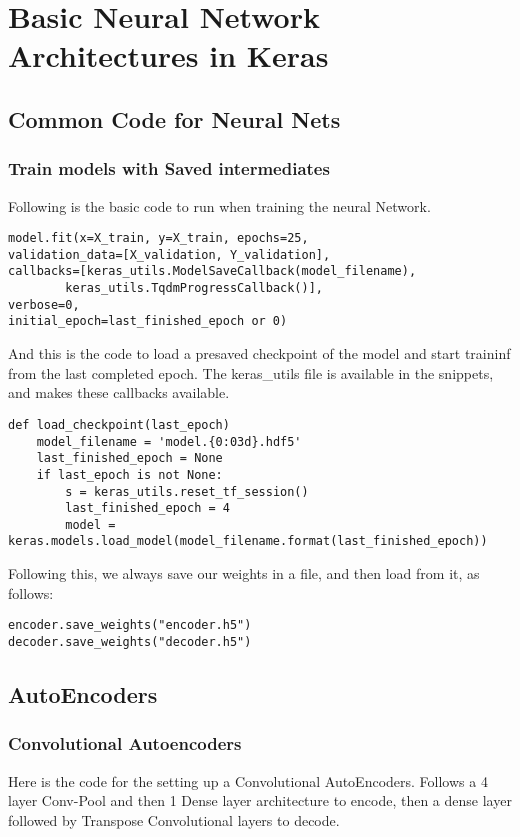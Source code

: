 \chapter{Basic Neural Network Architectures in Keras}

\section{Common Code for Neural Nets}


\subsection{Train models with Saved intermediates}


Following is the basic code to run when training the neural Network.

\begin{lstlisting}[style=py]
model.fit(x=X_train, y=X_train, epochs=25,
validation_data=[X_validation, Y_validation],
callbacks=[keras_utils.ModelSaveCallback(model_filename),
        keras_utils.TqdmProgressCallback()],
verbose=0,
initial_epoch=last_finished_epoch or 0)
\end{lstlisting}

And this is the code to load a presaved checkpoint of the model and start traininf from the last completed epoch. The keras\_utils file is available in the snippets, and makes these callbacks available.

\begin{lstlisting}[style=py]
def load_checkpoint(last_epoch)
    model_filename = 'model.{0:03d}.hdf5'
    last_finished_epoch = None
    if last_epoch is not None:
        s = keras_utils.reset_tf_session()
        last_finished_epoch = 4
        model = keras.models.load_model(model_filename.format(last_finished_epoch))
\end{lstlisting}

Following this, we always save our weights in a file, and then load from it, as follows:
\begin{lstlisting}[style=py]
encoder.save_weights("encoder.h5")
decoder.save_weights("decoder.h5")
\end{lstlisting}



\section{AutoEncoders}

\subsection{Convolutional Autoencoders}

Here is the code for the setting up a Convolutional AutoEncoders. Follows a 4 layer Conv-Pool and then 1 Dense layer architecture to encode, then a dense layer followed by Transpose Convolutional layers to decode.


